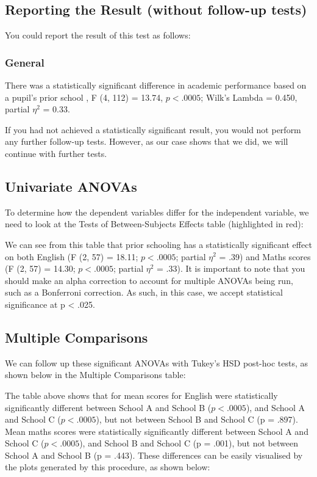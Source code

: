 \documentclass[12pt]{article} %
\begin{document}
\subsection{Reporting the Result (without follow-up tests)}
You could report the result of this test as follows:

\subsubsection{General}
There was a statistically significant difference in academic performance based on a pupil's prior school , F (4, 112) = 13.74, $p < .0005$; Wilk's Lambda = 0.450, partial $\eta^2$ = 0.33.

If you had not achieved a statistically significant result, you would not perform any further follow-up tests. However, as our case shows that we did, we will continue with further tests.





\subsection{Univariate ANOVAs}
To determine how the dependent variables differ for the independent variable, we need to look at the Tests of Between-Subjects Effects table (highlighted in red):



We can see from this table that prior schooling has a statistically significant effect on both English (F (2, 57) = 18.11; $p < .0005$; partial $\eta^2$ = .39) and Maths scores (F (2, 57) = 14.30; $p < .0005$; partial $\eta^2$ = .33). It is important to note that you should make an alpha correction to account for multiple ANOVAs being run, such as a Bonferroni correction. As such, in this case, we accept statistical significance at p < .025.


\subsection{Multiple Comparisons}
We can follow up these significant ANOVAs with Tukey's HSD post-hoc tests, as shown below in the Multiple Comparisons table:



The table above shows that for mean scores for English were statistically significantly different between School A and School B ($p < .0005$), and School A and School C ($p < .0005$), but not between School B and School C (p = .897). Mean maths scores were statistically significantly different between School A and School C ($p < .0005$), and School B and School C (p = .001), but not between School A and School B (p = .443). These differences can be easily visualised by the plots generated by this procedure, as shown below:
\end{document}
